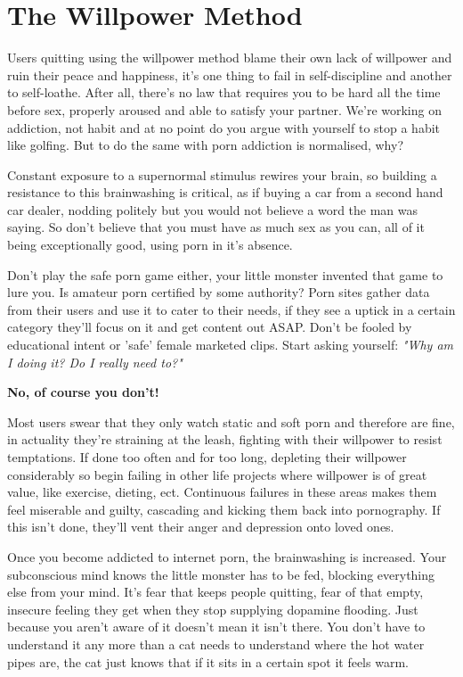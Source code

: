 \documentclass[easypeasy.tex]{subfiles}
\begin{document}
\section{The Willpower Method}
Users quitting using the willpower method blame their own lack of willpower and ruin their peace and happiness, it's one thing to fail in self-discipline and another to self-loathe. After all, there's no law that requires you to be hard all the time before sex, properly aroused and able to satisfy your partner. We're working on addiction, not habit and at no point do you argue with yourself to stop a habit like golfing. But to do the same with porn addiction is normalised, why?

Constant exposure to a supernormal stimulus rewires your brain, so building a resistance to this brainwashing is critical, as if buying a car from a second hand car dealer, nodding politely but you would not believe a word the man was saying. So don't believe that you must have as much sex as you can, all of it being exceptionally good, using porn in it's absence.

Don't play the safe porn game either, your little monster invented that game to lure you. Is amateur porn certified by some authority? Porn sites gather data from their users and use it to cater to their needs, if they see a uptick in a certain category they'll focus on it and get content out ASAP. Don't be fooled by educational intent or 'safe' female marketed clips. Start asking yourself: \textit{"Why am I doing it? Do I really need to?"}

\textbf{No, of course you don't!}

Most users swear that they only watch static and soft porn and therefore are fine, in actuality they're straining at the leash, fighting with their willpower to resist temptations. If done too often and for too long, depleting their willpower considerably so begin failing in other life projects where willpower is of great value, like exercise, dieting, ect. Continuous failures in these areas makes them feel miserable and guilty, cascading and kicking them back into pornography. If this isn't done, they'll vent their anger and depression onto loved ones.

Once you become addicted to internet porn, the brainwashing is increased. Your subconscious mind knows the little monster has to be fed, blocking everything else from your mind. It's fear that keeps people quitting, fear of that empty, insecure feeling they get when they stop supplying dopamine flooding. Just because you aren't aware of it doesn't mean it isn't there. You don't have to understand it any more than a cat needs to understand where the hot water pipes are, the cat just knows that if it sits in a certain spot it feels warm.
\end{document}
